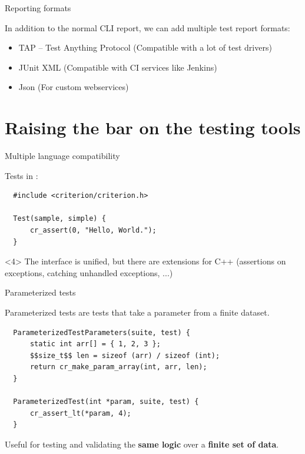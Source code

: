 \documentclass[10pt]{beamer}
\begin{document}
\begin{frame}[fragile]{Reporting formats}

  In addition to the normal CLI report, we can add multiple test report formats:

  \begin{itemize}
    \item TAP -- Test Anything Protocol (Compatible with a lot of test drivers)
    \item JUnit XML (Compatible with CI services like Jenkins)
    \item Json (For custom webservices)
  \end{itemize}

\end{frame}

\section{Raising the bar on the testing tools}

\begin{frame}[fragile]{Multiple language compatibility}

  Tests in :

  \begin{lstlisting}
  #include <criterion/criterion.h>

  Test(sample, simple) {
      cr_assert(0, "Hello, World.");
  }
  \end{lstlisting}

  \begin{onlyenv}<4>
  The interface is unified, but there are extensions for C++ (assertions on
  exceptions, catching unhandled exceptions, ...)
  \end{onlyenv}

\end{frame}

\begin{frame}[fragile]{Parameterized tests}

  Parameterized tests are tests that take a parameter from a finite dataset.

  \begin{lstlisting}
  ParameterizedTestParameters(suite, test) {
      static int arr[] = { 1, 2, 3 };
      $$size_t$$ len = sizeof (arr) / sizeof (int);
      return cr_make_param_array(int, arr, len);
  }

  ParameterizedTest(int *param, suite, test) {
      cr_assert_lt(*param, 4);
  }
  \end{lstlisting}

  \pause{}

  Useful for testing and validating the \textbf{same logic} over a \textbf{finite set of data}.

\end{frame}
\end{document}
